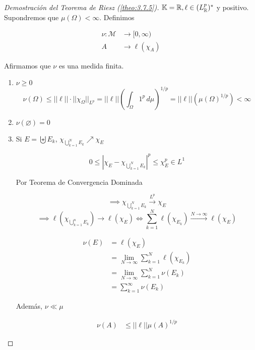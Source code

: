 \begin{proof}[Demostración del Teorema de Riesz (\ref{theo:3.7.5})]


    $\mathbb{K}=\mathbb{R}, \ell\in (L^p_{\mathbb{R}})^*$ y positivo. Supondremos que $\mu(\Omega)<\infty$. Definimos 

    \begin{align*}
        \nu:\mathcal{M}&\to [0,\infty)\\
        A&\to \ell(\chi_A)
    \end{align*}

    Afirmamos que $\nu$ es una medida finita.

    \begin{enumerate}[label=(\alph*)]
        \item $\nu\geq0$ 
        \[\nu(\Omega)\leq ||\ell||\cdot ||\chi_\Omega||_{L^p}=||\ell||\left(\int_\Omega 1^p\,d\mu\right)^{1/p}=||\ell||(\mu(\Omega)^{1/p})<\infty\]

        \item $\nu(\varnothing)=0$
        \item Si $E=\biguplus E_k$, $\chi_{\bigcup_{k=1}^N E_k}\nearrow \chi_E$
        
        \[0\leq |\chi_E-\chi_{\bigcup_{k=1}^N E_k}|^p\leq \chi_E^p\in L^1\]

        Por Teorema de Convergencia Dominada 

        \[\implies \chi_{\bigcup_{k=1}^N E_k}\xrightarrow{L^p}\chi_E\]
        \[\implies \ell(\chi_{\bigcup_{k=1}^n E_k})\to \ell(\chi_E)\iff \sum_{k=1}^N \ell(\chi_{E_k})\xrightarrow{N\to\infty} \ell(\chi_E)\]

        \begin{align*}
            \nu(E)&=\ell(\chi_E)\\
            &=\lim_{N\to\infty} \sum_{k=1}^N \ell(\chi_{E_k})\\
            &=\lim_{N\to\infty} \sum_{k=1}^N \nu(E_k)\\
            &=\sum_{k=1}^\infty \nu(E_k)
        \end{align*}

        Además, $\nu\ll \mu$

        \begin{align*}
            \nu(A)&\leq ||\ell||\mu(A)^{1/p}
        \end{align*}


\end{enumerate}
\end{proof}
